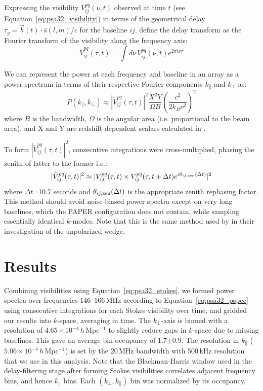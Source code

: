 Expressing the visibility $V_{ij}^{pq}(\nu,t)$ observed at time $t$ (see Equation~\ref{eq:psa32_visibility}) in terms of the geometrical delay $\tau_g=\vec{b}(t) \cdot \hat{s}(l,m)/c$ for the baseline $ij$, \citet{Parsons.12a} define the delay transform as the Fourier transform of the visibility along the frequency axis:
\begin{equation}
\tilde{V}_{ij}^{pq}(\tau,t) = \int d\nu \, V_{ij}^{pq}(\nu,t) e^{2\pi i \nu \tau}
\end{equation}

We can represent the power at each frequency and baseline in an array as a power spectrum in terms of their respective Fourier components $k_{\parallel}$ and $k_{\perp}$ as:
\begin{equation}
P(k_{\parallel},k_{\perp}) \approx |\tilde{V}_{ij}^{pq}(\tau,t)|^2 \frac{X^2Y}{\Omega B}\left(\frac{c^2}{2k_B\nu^2}\right)^2
\label{eq:psa32_pspec}
\end{equation}
where $B$ is the bandwidth, $\Omega$ is the angular area (i.e. proportional to the beam area), and X and Y are redshift-dependent scalars calculated in \citet{Parsons.12b}. 

To form $|\tilde{V}_{ij}^{pq}(\tau,t)|^2$, consecutive integrations were cross-multiplied, phasing the zenith of latter to the former i.e.:
\begin{equation}
|\tilde{V}_{ij}^{pq}(\tau,t)|^2 \approx |{V}_{ij}^{pq}(\tau,t)\times {V}_{ij}^{pq}(\tau,t+\Delta t)e^{i\theta_{ij,{\rm zen}}(\Delta t)}|^2
\end{equation}
where $\Delta t$=10.7 seconds and $\theta_{ij,{\rm zen}}(\Delta t)$ is the appropriate zenith rephasing factor. This method should avoid noise-biased power spectra except on very long baselines, which the PAPER configuration does not contain, while sampling essentially identical $k$-modes.  Note that this is the same method used by \citet{Pober.13} in their investigation of the unpolarized wedge.

\section{Results}
\label{sec:psa32_res}
Combining visibilities using Equation~\ref{eq:psa32_stokes}, we formed power spectra over frequencies 146--166\,MHz according to Equation~\ref{eq:psa32_pspec} using consecutive integrations for each Stokes visibility over time, and gridded our results into $k$-space, averaging in time. 
The $k_{\perp}$-axis is binned with a resolution of $4.65\times10^{-4}\,h$\,Mpc$^{-1}$ to slightly reduce gaps in $k$-space due to missing baselines. This gave an average bin occupancy of 1.7$\pm$0.9.
The resolution in $k_{\parallel}$ ($5.06\times10^{-4}\,h$\,Mpc$^{-1}$) is set by the 20\,MHz bandwidth with 500\,kHz resolution that we use in this analysis.
Note that the Blackman-Harris window used in the delay-filtering stage after forming Stokes visibilities correlates adjacent frequency bins, and hence $k_{\parallel}$ bins.
Each $(k_{\perp},k_{\parallel})$ bin was normalized by its occupancy.

